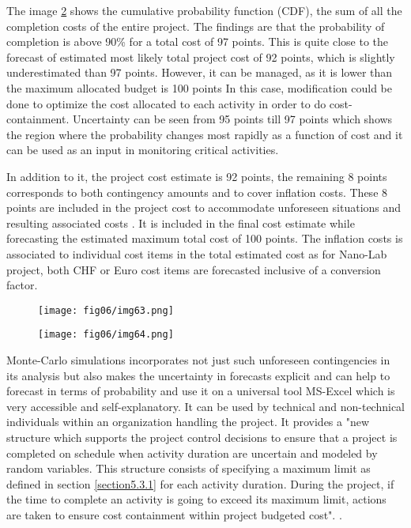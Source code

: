The image \ref{img12ch6} shows the cumulative probability function (CDF), the sum of all the completion costs of the entire project. The findings are that the probability of completion is above 90\% for a total cost of 97 points. This is quite close to the forecast of estimated most likely total project cost of 92 points, which is slightly underestimated than 97 points. However, it can be managed, as it is lower than the maximum allocated budget is 100 points In this case, modification could be done to optimize the cost allocated to each activity in order to do cost-containment. Uncertainty can be seen from 95 points till 97 points which shows the region where the probability changes most rapidly as a function of cost and it can be used as an input  in monitoring critical activities.

\clearpage
In addition to it, the project cost estimate is 92 points, the remaining 8 points corresponds to both contingency amounts and to cover inflation costs. These 8 points are included in the project cost to accommodate unforeseen situations and resulting associated costs \cite{cmu}. It is included in the final cost estimate while forecasting the estimated maximum total cost of 100 points. The inflation costs is associated to individual cost items in the total estimated cost as for Nano-Lab project, both CHF or Euro cost items are forecasted inclusive of a conversion factor. 



\begin{figure}
	\centering
	\texttt{[image: fig06/img63.png]}
	\label{img11ch6}
\end{figure}

\begin{figure}
	\centering
	\texttt{[image: fig06/img64.png]}
	\label{img12ch6}
\end{figure}
 
 Monte-Carlo simulations incorporates not just such unforeseen contingencies in its analysis but also makes the uncertainty in forecasts explicit and can help to forecast in terms of probability and use it on a universal tool MS-Excel which is very accessible and self-explanatory. It can be used by technical and non-technical individuals within an organization handling the project. It provides a "new structure which supports the project control decisions to ensure that a project is completed on schedule when activity duration are uncertain and modeled by random variables. This structure consists of specifying a maximum limit as defined in section \ref{section5.3.1} for each activity duration. During the project, if the time to complete an activity is going to exceed its maximum limit, actions are taken to ensure cost containment within project budgeted cost". \cite{BOWMAN20061191}.
 
